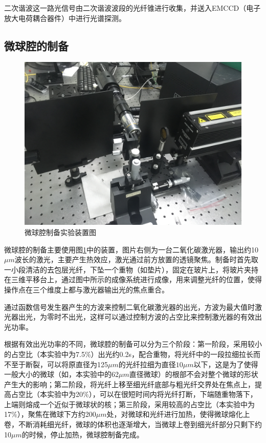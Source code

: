 \documentclass[UTF8,a4paper,cs4size,hyperref]{ctexart}
\begin{document}
二次谐波这一路光信号由二次谐波波段的光纤锥进行收集，并送入EMCCD（电子放大电荷耦合器件）中进行光谱探测。

\subsection{微球腔的制备}

\begin{figure}
\centering
\includegraphics[width=16cm ]{Setup_makingSphere}
\caption{微球腔制备实验装置图}
\label{pic:Setup_makingSphere}
\end{figure}

微球腔的制备主要使用图\ref{pic:Setup_makingSphere}中的装置，图片右侧为一台二氧化碳激光器，输出约10$\mu m$波长的激光，主要产生热效应，激光通过前方放置的透镜聚焦。制备时首先取一小段清洁的去包层光纤，下坠一个重物（如垫片），固定在玻片上，将玻片夹持在三维平移台上，通过图中所示的成像系统进行成像，用来调整光纤的位置，使得操作点在三个维度上都与激光器输出光的焦点重合。

通过函数信号发生器产生的方波来控制二氧化碳激光器的出光，方波为最大值时激光器出光，为零时不出光，这样可以通过控制方波的占空比来控制激光器的有效出光功率。

根据有效出光功率的不同，微球腔的制备可以分为三个阶段：第一阶段，采用较小的占空比（本实验中为7.5\%）出光约0.2s，配合重物，将光纤中的一段拉细拉长而不至于断裂，可以将原直径为125$\mu m$的光纤拉细为直径$10\mu m$以下，这是为了使得一般大小的微球（如，本实验中的62$\mu m$直径微球）的根部不会对整个微球的形状产生大的影响；第二阶段，将光纤上移至细光纤底部与粗光纤交界处在焦点上，提高占空比（本实验中为20\%），可以在很短时间内将光纤打断，下端随重物落下，上端则熔成一个近似于微球状的核；第三阶段，采用较高的占空比（本实验中为17\%），聚焦在微球下方约200$\mu m$处，对微球和光纤进行加热，使得微球熔化上卷，不断消耗细光纤，微球的体积也逐渐增大，当微球上卷到细光纤部分只剩下约10$\mu m$的时候，停止加热，微球腔制备完成。
\end{document}
